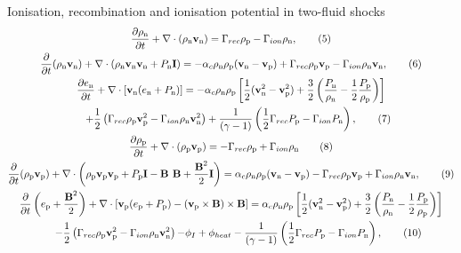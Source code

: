 \documentclass[10pt,aspectratio=169,usenames,dvipsnames]{beamer}
\begin{document}
\begin{frame}{Ionisation, recombination and ionisation potential in two-fluid shocks}
\footnotesize
\begin{gather}
\frac{\partial \rho _{\text{n}}}{\partial t} + \nabla \cdot (\rho _{\text{n}} \textbf{v}_{\text{n}})= \Gamma _{rec} \rho _{\rm p} - \Gamma _{ion} \rho _{\rm n}, \label{eqn:neutral1}\tag{5} \\
\frac{\partial}{\partial t}(\rho _{\text{n}} \textbf{v}_{\text{n}}) + \nabla \cdot (\rho _{\text{n}} \textbf{v}_{\text{n}} \textbf{v}_{\text{n}} + P_{\text{n}} \textbf{I}) = -\alpha _c \rho_{\text{n}} \rho_{\text{p}} (\textbf{v}_{\text{n}}-\textbf{v}_{\text{p}}) + \Gamma _{rec} \rho _{\rm p} \textbf{v}_{\rm p} - \Gamma _{ion} \rho_{\rm n} \textbf{v}_{\rm n}, \tag{6}\\
\frac{\partial e_{\text{n}}}{\partial t} + \nabla \cdot \left[\textbf{v}_{\text{n}} (e_{\text{n}} +P_{\text{n}}) \right] = -\alpha _c \rho _{\text{n}} \rho _{\text{p}} \left[ \frac{1}{2} (\textbf{v}_{\text{n}} ^2 - \textbf{v}_{\text{p}} ^2)+ \frac{3}{2} \left(\frac{P_{\rm n}}{\rho_{\rm n}}-\frac{1}{2}\frac{P_{\rm p}}{\rho_{\rm p}}\right) \right] \nonumber \\ \hspace{0.5cm}+ \frac{1}{2} \left( \Gamma _{rec} \rho _{\rm p} \textbf{v}_{\rm p} ^2 - \Gamma _{ion} \rho _{\rm n} \textbf{v}_{\rm n} ^2 \right) +\frac{1}{ (\gamma-1)} \left( \frac{1}{2} \Gamma _{rec} P_{\rm p} -\Gamma _{ion} P_{\rm n} \right), \tag{7}\\
\frac{\partial \rho _{\text{p}}}{\partial t} + \nabla \cdot (\rho_{\text{p}} \textbf{v}_{\text{p}}) = - \Gamma _{rec} \rho _{\rm p} + \Gamma _{ion} \rho _{\rm n} \label{eqn:plasma1}\tag{8}\\
\frac{\partial}{\partial t} (\rho_{\text{p}} \textbf{v}_{\text{p}})+ \nabla \cdot \left( \rho_{\text{p}} \textbf{v}_{\text{p}} \textbf{v}_{\text{p}} + P_{\text{p}} \textbf{I} - \textbf{B B} + \frac{\textbf{B}^2}{2} \textbf{I} \right) = \alpha _c \rho_{\text{n}} \rho_{\text{p}}(\textbf{v}_{\text{n}} - \textbf{v}_{\text{p}}) - \Gamma _{rec} \rho _{\rm p} \textbf{v}_{\rm p} + \Gamma _{ion} \rho_{\rm n} \textbf{v}_{\rm n},\tag{9}\\
\frac{\partial}{\partial t} \left( e_{\text{p}} + \frac{\textbf{B}^2}{2} \right) + \nabla \cdot \left[ \textbf{v}_{\text{p}} ( e_{\text{p}} + P_{\text{p}}) -  (\textbf{v}_{\rm p} \times \textbf{B}) \times \textbf{B} \right]  =  \alpha _c \rho _{\text{n}} \rho _{\text{p}} \left[ \frac{1}{2} (\textbf{v}_{\text{n}} ^2 - \textbf{v}_{\text{p}} ^2)+ \frac{3}{2} \left(\frac{P_{\rm n}}{\rho_{\rm n}}-\frac{1}{2}\frac{P_{\rm p}}{\rho_{\rm p}}\right) \right] \nonumber \\ \hspace{0.5cm}- \frac{1}{2} \left( \Gamma _{rec} \rho _{\rm p} \textbf{v}_{\rm p} ^2 - \Gamma _{ion} \rho _{\rm n} \textbf{v}_{\rm n} ^2 \right) {- \phi_I + \phi_{heat}} -\frac{1}{ (\gamma-1)} \left( \frac{1}{2} \Gamma _{rec} P_{\rm p} -\Gamma _{ion} P_{\rm n} \right), \label{eqn:ep}\tag{10} \\

\end{gather}
\end{frame}
\end{document}
